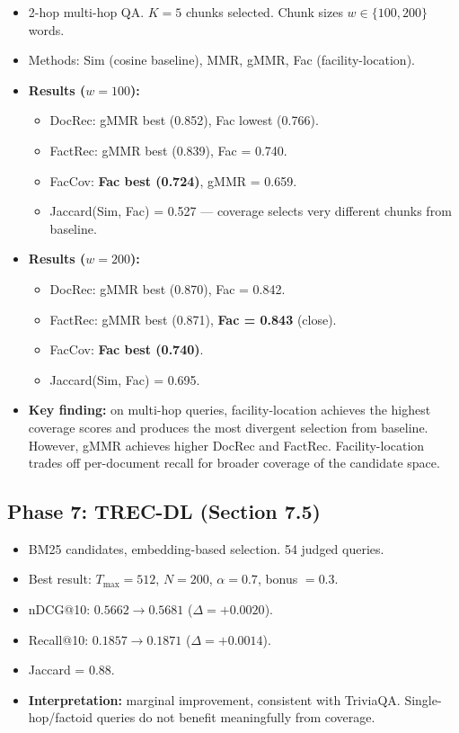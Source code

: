 \documentclass[11pt,a4paper]{article}
\begin{document}
\begin{itemize}[leftmargin=*]
	\item 2-hop multi-hop QA. $K = 5$ chunks selected. Chunk sizes $w \in \{100, 200\}$ words.
	\item Methods: Sim (cosine baseline), MMR, gMMR, Fac (facility-location).
	\item \textbf{Results ($w = 100$):}
	      \begin{itemize}
		      \item DocRec: gMMR best (0.852), Fac lowest (0.766).
		      \item FactRec: gMMR best (0.839), Fac = 0.740.
		      \item FacCov: \textbf{Fac best (0.724)}, gMMR = 0.659.
		      \item Jaccard(Sim, Fac) = 0.527 --- coverage selects very different chunks from baseline.
	      \end{itemize}
	\item \textbf{Results ($w = 200$):}
	      \begin{itemize}
		      \item DocRec: gMMR best (0.870), Fac = 0.842.
		      \item FactRec: gMMR best (0.871), \textbf{Fac = 0.843} (close).
		      \item FacCov: \textbf{Fac best (0.740)}.
		      \item Jaccard(Sim, Fac) = 0.695.
	      \end{itemize}
	\item \textbf{Key finding:} on multi-hop queries, facility-location achieves the highest coverage scores and produces the most divergent selection from baseline. However, gMMR achieves higher DocRec and FactRec. Facility-location trades off per-document recall for broader coverage of the candidate space.
\end{itemize}

\subsection{Phase 7: TREC-DL (Section 7.5)}

\begin{itemize}[leftmargin=*]
	\item BM25 candidates, embedding-based selection. 54 judged queries.
	\item Best result: $T_{\max} = 512$, $N = 200$, $\alpha = 0.7$, bonus $= 0.3$.
	\item nDCG@10: $0.5662 \to 0.5681$ ($\Delta = +0.0020$).
	\item Recall@10: $0.1857 \to 0.1871$ ($\Delta = +0.0014$).
	\item Jaccard = 0.88.
	\item \textbf{Interpretation:} marginal improvement, consistent with TriviaQA. Single-hop/factoid queries do not benefit meaningfully from coverage.
\end{itemize}
\end{document}
